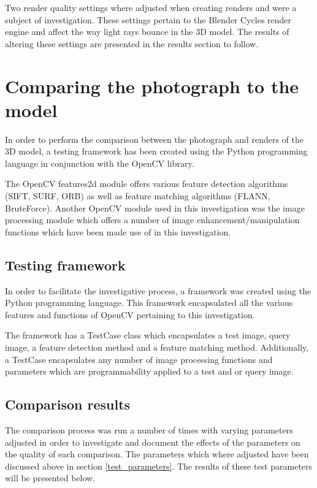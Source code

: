 \documentclass[11pt,a4paper]{report}
\begin{document}
			Two render quality settings where adjusted when creating renders and were a subject of investigation. These settings pertain to the Blender Cycles render engine and affect the way light rays bounce in the 3D model. The results of altering these settings are presented in the results section to follow.

	\section{Comparing the photograph to the model}
		In order to perform the comparison between the photograph and renders of the 3D model, a testing framework has been created using the Python programming language in conjunction with the OpenCV library.
		
		The OpenCV features2d module offers various feature detection algorithms (SIFT, SURF, ORB) as well as feature matching algorithms (FLANN, BruteForce). Another OpenCV module used in this investigation was the image processing module which offers a number of image enhancement/manipulation functions which have been made use of in this investigation.
		
		\subsection{Testing framework}
			In order to facilitate the investigative process, a framework was created using the Python programming language. This framework encapsulated all the various features and functions of OpenCV pertaining to this investigation.
			
			The framework has a TestCase class which encapsulates a test image, query image, a feature detection method and a feature matching method. Additionally, a TestCase encapsulates any number of image processing functions and parameters which are programmability applied to a test and or query image.
			
		\subsection{Comparison results}
			The comparison process was run a number of times with varying parameters adjusted in order to investigate and document the effects of the parameters on the quality of each comparison. The parameters which where adjusted have been discussed above in section \ref{test_parameters}. The results of these test parameters will be presented below.
			
\end{document}
